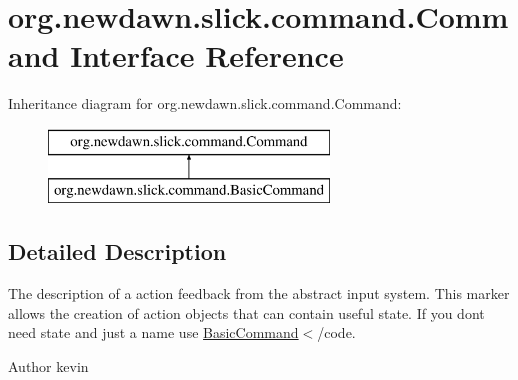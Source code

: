 \hypertarget{interfaceorg_1_1newdawn_1_1slick_1_1command_1_1_command}{}\section{org.\+newdawn.\+slick.\+command.\+Command Interface Reference}
\label{interfaceorg_1_1newdawn_1_1slick_1_1command_1_1_command}
Inheritance diagram for org.\+newdawn.\+slick.\+command.\+Command\+:\begin{figure}[H]
\begin{center}
\leavevmode
\includegraphics[height=2.000000cm]{interfaceorg_1_1newdawn_1_1slick_1_1command_1_1_command}
\end{center}
\end{figure}


\subsection{Detailed Description}
The description of a action feedback from the abstract input system. This marker allows the creation of action objects that can contain useful state. If you don\textquotesingle{}t need state and just a name use {\ttfamily \mbox{\hyperlink{classorg_1_1newdawn_1_1slick_1_1command_1_1_basic_command}{Basic\+Command}}$<$/code.}

{\ttfamily \begin{DoxyAuthor}{Author}
kevin 
\end{DoxyAuthor}
}